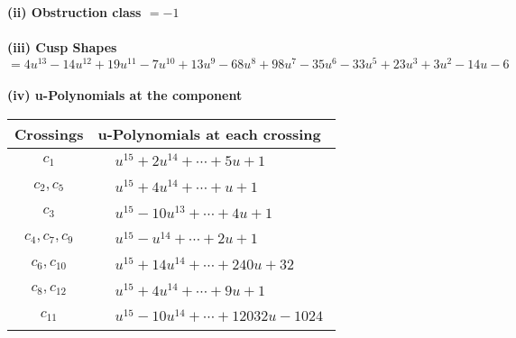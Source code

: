\documentclass[1p]{elsarticle_modified}
\theoremstyle{definition}
\begin{document}
\flushleft \textbf{(ii) Obstruction class $= -1$}\\~\\
\flushleft \textbf{(iii) Cusp Shapes $= 4 u^{13}-14 u^{12}+19 u^{11}-7 u^{10}+13 u^9-68 u^8+98 u^7-35 u^6-33 u^5+23 u^3+3 u^2-14 u-6$}\\~\\
\newpage\renewcommand{\arraystretch}{1}
\flushleft \textbf{(iv) u-Polynomials at the component}\newline \\
\begin{tabular}{m{50pt}|m{274pt}}
Crossings & \hspace{64pt}u-Polynomials at each crossing \\
\hline $$\begin{aligned}c_{1}\end{aligned}$$&$\begin{aligned}
&u^{15}+2 u^{14}+\cdots+5 u+1
\end{aligned}$\\
\hline $$\begin{aligned}c_{2},c_{5}\end{aligned}$$&$\begin{aligned}
&u^{15}+4 u^{14}+\cdots+u+1
\end{aligned}$\\
\hline $$\begin{aligned}c_{3}\end{aligned}$$&$\begin{aligned}
&u^{15}-10 u^{13}+\cdots+4 u+1
\end{aligned}$\\
\hline $$\begin{aligned}c_{4},c_{7},c_{9}\end{aligned}$$&$\begin{aligned}
&u^{15}- u^{14}+\cdots+2 u+1
\end{aligned}$\\
\hline $$\begin{aligned}c_{6},c_{10}\end{aligned}$$&$\begin{aligned}
&u^{15}+14 u^{14}+\cdots+240 u+32
\end{aligned}$\\
\hline $$\begin{aligned}c_{8},c_{12}\end{aligned}$$&$\begin{aligned}
&u^{15}+4 u^{14}+\cdots+9 u+1
\end{aligned}$\\
\hline $$\begin{aligned}c_{11}\end{aligned}$$&$\begin{aligned}
&u^{15}-10 u^{14}+\cdots+12032 u-1024
\end{aligned}$\\
\hline
\end{tabular}\\~\\
\end{document}
